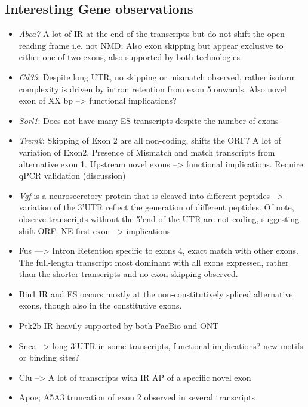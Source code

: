 
\subsection{Interesting Gene observations}
\begin{itemize}
	\item \textit{Abca7} A lot of IR at the end of the transcripts but do not shift the open reading frame i.e. not NMD; Also exon skipping but appear exclusive to either one of two exons, also supported by both technologies 
	\item \textit{Cd33}: Despite long UTR, no skipping or mismatch observed, rather isoform complexity is driven by intron retention from exon 5 onwards. Also novel exon of XX bp --> functional implications?
	\item \textit{Sorl1}: Does not have many ES transcripts despite the number of exons
	\item \textit{Trem2}: Skipping of Exon 2 are all non-coding, shifts the ORF? A lot of variation of Exon2. Presence of Mismatch and match transcripts from alternative exon 1. Upstream novel exons --> functional implications. Require qPCR validation (discussion) 
	\item \textit{Vgf} is a neurosecretory protein that is cleaved into different peptides --> variation of the 3'UTR reflect the generation of different peptides. Of note, observe transcripts without the 5'end of the UTR are not coding, suggesting shift ORF. NE first exon --> implications 
	\item Fus ---> Intron Retention specific to exons 4, exact match with other exons. The full-length transcript most dominant with all exons expressed, rather than the shorter transcripts and no exon skipping observed. 
	\item Bin1 IR and ES occurs mostly at the non-constitutively spliced alternative exons, though also in the constitutive exons. 
	\item Ptk2b IR heavily supported by both PacBio and ONT 
	\item Snca --> long 3'UTR in some transcripts, functional implications? new motifs or binding sites?
	\item Clu --> A lot of transcripts with IR AP of a specific novel exon
	\item Apoe; A5A3 truncation of exon 2 observed in several transcripts
\end{itemize} 

